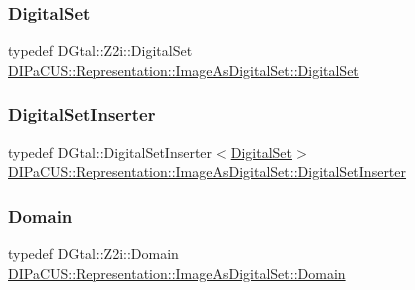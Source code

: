 \subsubsection{\texorpdfstring{Digital\+Set}{DigitalSet}}
{\footnotesize\ttfamily typedef D\+Gtal\+::\+Z2i\+::\+Digital\+Set \mbox{\hyperlink{structDIPaCUS_1_1Representation_1_1ImageAsDigitalSet_a3a19b478392377afed24a5234dfdbd68}{D\+I\+Pa\+C\+U\+S\+::\+Representation\+::\+Image\+As\+Digital\+Set\+::\+Digital\+Set}}}

\mbox{\label{structDIPaCUS_1_1Representation_1_1ImageAsDigitalSet_a81f59f774fe5b44575a6ffdf29e60ee8}} 
\subsubsection{\texorpdfstring{Digital\+Set\+Inserter}{DigitalSetInserter}}
{\footnotesize\ttfamily typedef D\+Gtal\+::\+Digital\+Set\+Inserter$<$\mbox{\hyperlink{structDIPaCUS_1_1Representation_1_1ImageAsDigitalSet_a3a19b478392377afed24a5234dfdbd68}{Digital\+Set}}$>$ \mbox{\hyperlink{structDIPaCUS_1_1Representation_1_1ImageAsDigitalSet_a81f59f774fe5b44575a6ffdf29e60ee8}{D\+I\+Pa\+C\+U\+S\+::\+Representation\+::\+Image\+As\+Digital\+Set\+::\+Digital\+Set\+Inserter}}}

\mbox{\label{structDIPaCUS_1_1Representation_1_1ImageAsDigitalSet_acc30a7e7d3f45b546be17ca4d2961e0e}} 
\subsubsection{\texorpdfstring{Domain}{Domain}}
{\footnotesize\ttfamily typedef D\+Gtal\+::\+Z2i\+::\+Domain \mbox{\hyperlink{structDIPaCUS_1_1Representation_1_1ImageAsDigitalSet_acc30a7e7d3f45b546be17ca4d2961e0e}{D\+I\+Pa\+C\+U\+S\+::\+Representation\+::\+Image\+As\+Digital\+Set\+::\+Domain}}}

